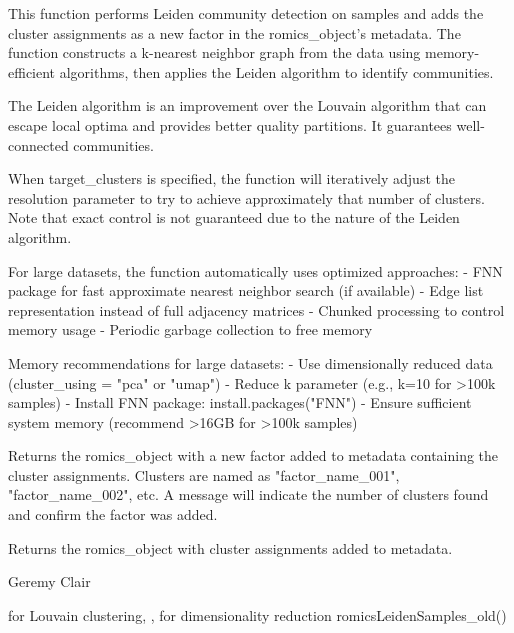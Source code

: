 \documentclass[a4paper]{book}
\begin{document}
\begin{Details}
This function performs Leiden community detection on samples and adds the cluster assignments
as a new factor in the romics\_object's metadata. The function constructs a k-nearest neighbor
graph from the data using memory-efficient algorithms, then applies the Leiden algorithm to identify communities.

The Leiden algorithm is an improvement over the Louvain algorithm that can escape local optima
and provides better quality partitions. It guarantees well-connected communities.

When target\_clusters is specified, the function will iteratively adjust the resolution parameter
to try to achieve approximately that number of clusters. Note that exact control is not guaranteed
due to the nature of the Leiden algorithm.

For large datasets, the function automatically uses optimized approaches:
- FNN package for fast approximate nearest neighbor search (if available)
- Edge list representation instead of full adjacency matrices
- Chunked processing to control memory usage
- Periodic garbage collection to free memory

Memory recommendations for large datasets:
- Use dimensionally reduced data (cluster\_using = "pca" or "umap")
- Reduce k parameter (e.g., k=10 for >100k samples)
- Install FNN package: install.packages("FNN")
- Ensure sufficient system memory (recommend >16GB for >100k samples)
\end{Details}
%
\begin{Value}
Returns the romics\_object with a new factor added to metadata containing the cluster assignments.
Clusters are named as "factor\_name\_001", "factor\_name\_002", etc.
A message will indicate the number of clusters found and confirm the factor was added.

Returns the romics\_object with cluster assignments added to metadata.
\end{Value}
%
\begin{Author}
Geremy Clair
\end{Author}
%
\begin{SeeAlso}
 for Louvain clustering,
,  for dimensionality reduction
romicsLeidenSamples\_old()
\end{SeeAlso}
%
\end{document}
